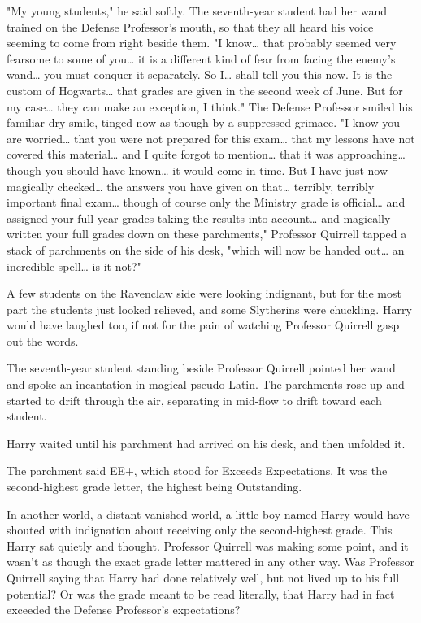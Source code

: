 "My young students," he said softly. The seventh-year student had her wand 
trained on the Defense Professor's mouth, so that they all heard his voice 
seeming to come from right beside them. "I know{\ldots} that probably seemed 
very fearsome to some of you{\ldots} it is a different kind of fear from facing 
the enemy's wand{\ldots} you must conquer it separately. So I{\ldots} shall 
tell you this now. It is the custom of Hogwarts{\ldots} that grades are given 
in the second week of June. But for my case{\ldots} they can make an exception, 
I think." The Defense Professor smiled his familiar dry smile, tinged now as 
though by a suppressed grimace. "I know you are worried{\ldots} that you were 
not prepared for this exam{\ldots} that my lessons have not covered this 
material{\ldots} and I quite forgot to mention{\ldots} that it was 
approaching{\ldots} though you should have known{\ldots} it would come in time. 
But I have just now magically checked{\ldots} the answers you have given on 
that{\ldots} terribly, terribly important final exam{\ldots} though of course 
only the Ministry grade is official{\ldots} and assigned your full-year grades 
taking the results into account{\ldots} and magically written your full grades 
down on these parchments," Professor Quirrell tapped a stack of parchments on 
the side of his desk, "which will now be handed out{\ldots} an incredible 
spell{\ldots} is it not?"

A few students on the Ravenclaw side were looking indignant, but for the most 
part the students just looked relieved, and some Slytherins were chuckling. 
Harry would have laughed too, if not for the pain of watching Professor 
Quirrell gasp out the words.

The seventh-year student standing beside Professor Quirrell pointed her wand 
and spoke an incantation in magical pseudo-Latin. The parchments rose up and 
started to drift through the air, separating in mid-flow to drift toward each 
student.

Harry waited until his parchment had arrived on his desk, and then unfolded it.

The parchment said EE+, which stood for Exceeds Expectations. It was the 
second-highest grade letter, the highest being Outstanding.

In another world, a distant vanished world, a little boy named Harry would have 
shouted with indignation about receiving only the second-highest grade. This 
Harry sat quietly and thought. Professor Quirrell was making some point, and it 
wasn't as though the exact grade letter mattered in any other way. Was 
Professor Quirrell saying that Harry had done relatively well, but not lived up 
to his full potential? Or was the grade meant to be read literally, that Harry 
had in fact exceeded the Defense Professor's expectations?

